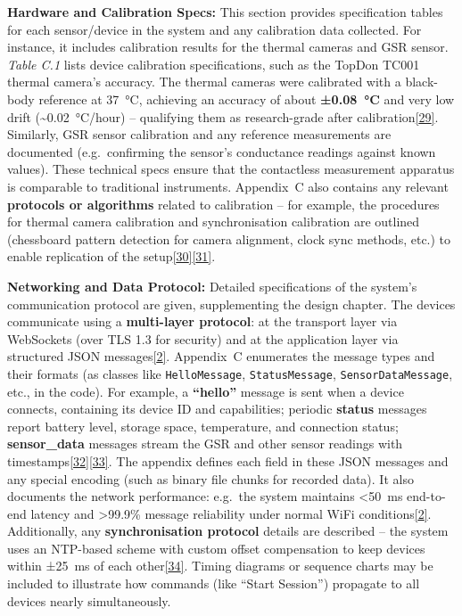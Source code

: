 \documentclass[12pt,a4paper]{article}
\begin{document}
\textbf{Hardware and Calibration Specs:} This section provides specification tables for each sensor/device in the system and any calibration data collected. For instance, it includes calibration results for the thermal cameras and GSR sensor. \emph{Table C.1} lists device calibration specifications, such as the TopDon TC001 thermal camera's accuracy. The thermal cameras were calibrated with a black-body reference at 37~°C, achieving an accuracy of about \textbf{±0.08~°C} and very low drift (\textasciitilde0.02~°C/hour) -- qualifying them as research-grade after calibration\href{docs/thesis_report/Chapter_7_Appendices.md\#L74-L82}{{[}29{]}}. Similarly, GSR sensor calibration and any reference measurements are documented (e.g.~confirming the sensor's conductance readings against known values). These technical specs ensure that the contactless measurement apparatus is comparable to traditional instruments. Appendix~C also contains any relevant \textbf{protocols or algorithms} related to calibration -- for example, the procedures for thermal camera calibration and synchronisation calibration are outlined (chessboard pattern detection for camera alignment, clock sync methods, etc.) to enable replication of the setup\href{docs/thesis_report/Chapter_7_Appendices.md\#L92-L100}{{[}30{]}}\href{docs/thesis_report/Chapter_7_Appendices.md\#L96-L99}{{[}31{]}}.

\textbf{Networking and Data Protocol:} Detailed specifications of the system's communication protocol are given, supplementing the design chapter. The devices communicate using a \textbf{multi-layer protocol}: at the transport layer via WebSockets (over TLS 1.3 for security) and at the application layer via structured JSON messages\href{docs/thesis_report/Chapter_7_Appendices.md\#L111-L119}{{[}2{]}}. Appendix~C enumerates the message types and their formats (as classes like \passthrough{\lstinline!HelloMessage!}, \passthrough{\lstinline!StatusMessage!}, \passthrough{\lstinline!SensorDataMessage!}, etc., in the code). For example, a \textbf{``hello''} message is sent when a device connects, containing its device ID and capabilities; periodic \textbf{status} messages report battery level, storage space, temperature, and connection status; \textbf{sensor\_data} messages stream the GSR and other sensor readings with timestamps\href{PythonApp/network/pc_server.py\#L44-L53}{{[}32{]}}\href{PythonApp/network/pc_server.py\#L90-L98}{{[}33{]}}. The appendix defines each field in these JSON messages and any special encoding (such as binary file chunks for recorded data). It also documents the network performance: e.g.~the system maintains \textless50~ms end-to-end latency and \textgreater99.9\% message reliability under normal WiFi conditions\href{docs/thesis_report/Chapter_7_Appendices.md\#L111-L119}{{[}2{]}}. Additionally, any \textbf{synchronisation protocol} details are described -- the system uses an NTP-based scheme with custom offset compensation to keep devices within ±25~ms of each other\href{docs/thesis_report/Chapter_7_Appendices.md\#L113-L115}{{[}34{]}}. Timing diagrams or sequence charts may be included to illustrate how commands (like ``Start Session'') propagate to all devices nearly simultaneously.
\end{document}
